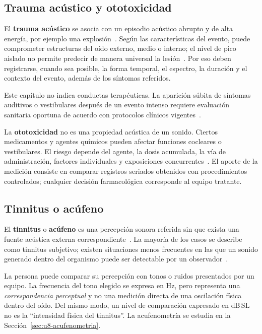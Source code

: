 \subsection{Trauma acústico y ototoxicidad}
\label{sec:u8-trauma}

El \textbf{trauma acústico} se asocia con un episodio acústico abrupto
y de alta energía, por ejemplo una explosión~\cite{ryan2016,kurabi2017}. Según las características
del evento, puede comprometer estructuras del oído externo, medio o interno;
el nivel de pico aislado no permite predecir de manera universal la lesión~\cite{ryan2016,kurabi2017}.
Por eso deben registrarse, cuando sea posible, la forma temporal, el espectro,
la duración y el contexto del evento, además de los síntomas referidos.

Este capítulo no indica conductas terapéuticas. La aparición súbita de
síntomas auditivos o vestibulares después de un evento intenso requiere
evaluación sanitaria oportuna de acuerdo con protocolos clínicos vigentes~\cite{ashaHearingAdults}.

La \textbf{ototoxicidad} no es una propiedad acústica de un sonido.
Ciertos medicamentos y agentes químicos pueden afectar funciones
cocleares o vestibulares. El riesgo depende del agente, la dosis acumulada,
la vía de administración, factores individuales y exposiciones concurrentes~\cite{nioshOtotoxic2018}.
El aporte de la medición consiste en comparar registros seriados obtenidos con
procedimientos controlados; cualquier decisión farmacológica corresponde al
equipo tratante.

\subsection{Tinnitus o acúfeno}
\label{sec:u8-tinnitus}

El \textbf{tinnitus} o \textbf{acúfeno} es una percepción sonora
referida sin que exista una fuente acústica externa correspondiente~\cite{ashaTinnitus}.
La mayoría de
los casos se describe como tinnitus subjetivo; existen situaciones menos
frecuentes en las que un sonido generado dentro del organismo puede ser
detectable por un observador~\cite{ashaTinnitus}.

La persona puede comparar su percepción con tonos o ruidos presentados por un
equipo. La frecuencia del tono elegido se expresa en \(\mathrm{Hz}\), pero
representa una \emph{correspondencia perceptual} y no una medición directa de
una oscilación física dentro del oído. Del mismo modo, un nivel de
comparación expresado en \(\mathrm{dB\,SL}\) no es la ``intensidad física del
tinnitus''. La acufenometría se estudia en la
Sección~\ref{sec:u8-acufenometria}.

